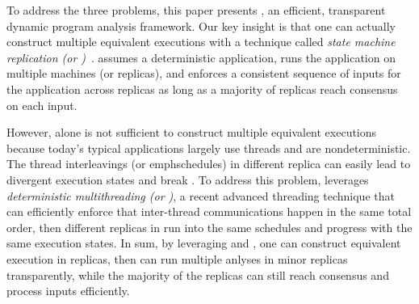 

To address the three problems, this paper presents \xxx, an efficient, 
transparent dynamic program analysis framework. Our key insight is that one can 
actually construct multiple equivalent executions with a technique called 
\emph{state machine replication (or \smr)}~\cite{paxos:simple, 
paxos:practical}. \smr assumes a deterministic application, runs the 
application on multiple machines (or replicas), and enforces a consistent 
sequence of inputs for the application across replicas as long as a majority of 
replicas reach consensus on each input.


However, \smr alone is not sufficient to construct multiple equivalent 
executions because today's typical applications largely use threads and are 
nondeterministic. The thread interleavings (or emph{schedules}) in different 
replica can easily lead to divergent execution states and break \smr. To 
address this problem, \xxx leverages \emph{deterministic multithreading (or 
\dmt)}, a recent advanced threading technique that can efficiently enforce that 
inter-thread communications happen in the same total order, then different 
replicas in \smr run into the same schedules and progress with the same 
execution states. In sum, by leveraging \smr and \dmt, one can construct 
equivalent execution in replicas, then \xxx can run multiple anlyses in 
minor replicas transparently, while the majority of the replicas can still 
reach consensus and process inputs efficiently.



